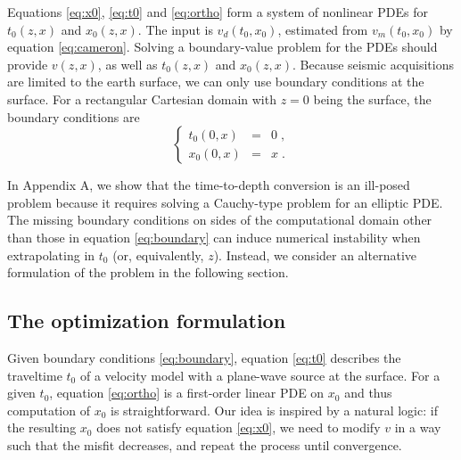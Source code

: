 Equations \ref{eq:x0}, \ref{eq:t0} and \ref{eq:ortho} form a system of nonlinear PDEs for $t_0 (z,x)$ and 
$x_0 (z,x)$. The input is $v_d (t_0,x_0)$, estimated from $v_m (t_0,x_0)$ by equation \ref{eq:cameron}. Solving a 
boundary-value problem for the PDEs should provide $v (z,x)$, as well as $t_0 (z,x)$ and $x_0 (z,x)$. 
Because seismic acquisitions are 
limited to the earth surface, we can only use boundary conditions at the surface. For a rectangular Cartesian 
domain with $z =0$ being the surface, the boundary conditions are
\begin{equation}
\label{eq:boundary}
\left\{ \begin{array}{lcl}
t_0 (0, x) & = & 0\;, \\
x_0 (0, x) & = & x\;.
\end{array} \right.
\end{equation}

In Appendix A, we show that the time-to-depth conversion is an ill-posed problem because it requires solving 
a Cauchy-type problem for an elliptic PDE. The missing boundary conditions on sides of the computational domain 
other than those in equation \ref{eq:boundary} can induce numerical instability when extrapolating in $t_0$ 
(or, equivalently, $z$). Instead, we consider an alternative formulation of the problem in the following section.

\subsection{The optimization formulation}

Given boundary conditions \ref{eq:boundary}, equation \ref{eq:t0} describes the traveltime $t_0$ 
of a velocity model with a plane-wave source at the surface. For a given $t_0$, equation 
\ref{eq:ortho} is a first-order linear PDE on $x_0$ and thus computation of $x_0$ is 
straightforward. Our idea is inspired by a natural logic: if the resulting $x_0$ does not satisfy equation 
\ref{eq:x0}, we need to modify $v$ in a way such that the misfit decreases, and repeat the 
process until convergence.

